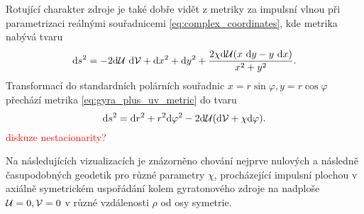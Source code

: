 Rotující charakter zdroje je také dobře vidět z metriky za impulsní vlnou při parametrizaci reálnými souřadnicemi \eqref{eq:complex_coordinates},
kde metrika nabývá tvaru
\begin{equation}
    \label{eq:gyra_plus_uv_metric}
    \mathrm{d} s^2 = -2 \mathrm{d} \mathcal{U} ~ \mathrm{d} \mathcal{V} + \mathrm{d} x^2 + \mathrm{d} y^2 + \frac{2 \chi \mathrm{d} \mathcal{U} (x~\mathrm{d} y - y~\mathrm{d} x)}{x^2 + y^2}.
\end{equation}
Transformací do standardních polárních souřadnic $x = r \sin{\varphi}, y = r \cos{\varphi}$ přechází metrika \eqref{eq:gyra_plus_uv_metric} do tvaru
\begin{equation}
    \mathrm{d} s^2 = \mathrm{d} r^2 + r^2 \mathrm{d} \varphi^2 - 2 \mathrm{d} \mathcal{U} (\mathrm{d} \mathcal{V} + \chi \mathrm{d} \varphi).
\end{equation}
\textcolor{red}{diskuze nestacionarity?}

Na následujících vizualizacích je znázorněno chování nejprve nulových a následně časupodobných geodetik pro různé parametry $\chi$, procházející impulsní plochou v
axiálně symetrickém uspořádání kolem gyratonového zdroje na nadploše $\mathcal{U} = 0, \mathcal{V}=0$ v různé vzdálenosti $\rho$ od osy symetrie.

